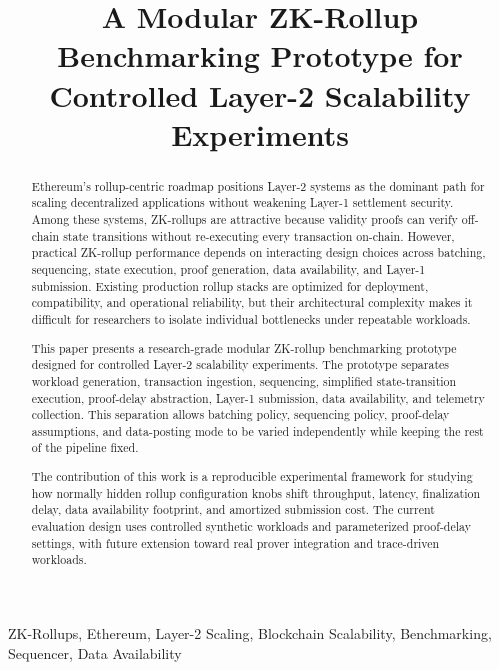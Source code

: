 \documentclass[conference]{IEEEtran}
\begin{document}
\title{A Modular ZK-Rollup Benchmarking Prototype for Controlled Layer-2 Scalability Experiments}



\maketitle

\begin{abstract}
Ethereum's rollup-centric roadmap positions Layer-2 systems as the dominant path for scaling decentralized applications without weakening Layer-1 settlement security. Among these systems, ZK-rollups are attractive because validity proofs can verify off-chain state transitions without re-executing every transaction on-chain. However, practical ZK-rollup performance depends on interacting design choices across batching, sequencing, state execution, proof generation, data availability, and Layer-1 submission. Existing production rollup stacks are optimized for deployment, compatibility, and operational reliability, but their architectural complexity makes it difficult for researchers to isolate individual bottlenecks under repeatable workloads.

This paper presents a research-grade modular ZK-rollup benchmarking prototype designed for controlled Layer-2 scalability experiments. The prototype separates workload generation, transaction ingestion, sequencing, simplified state-transition execution, proof-delay abstraction, Layer-1 submission, data availability, and telemetry collection. This separation allows batching policy, sequencing policy, proof-delay assumptions, and data-posting mode to be varied independently while keeping the rest of the pipeline fixed.

The contribution of this work is a reproducible experimental framework for studying how normally hidden rollup configuration knobs shift throughput, latency, finalization delay, data availability footprint, and amortized submission cost. The current evaluation design uses controlled synthetic workloads and parameterized proof-delay settings, with future extension toward real prover integration and trace-driven workloads.
\end{abstract}

\begin{IEEEkeywords}
ZK-Rollups, Ethereum, Layer-2 Scaling, Blockchain Scalability, Benchmarking, Sequencer, Data Availability
\end{IEEEkeywords}










\end{document}
